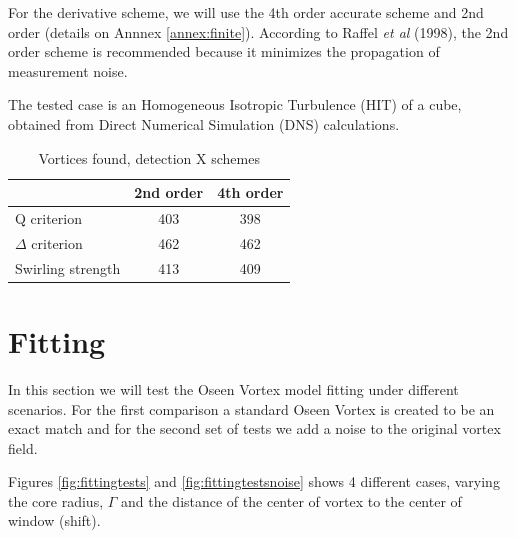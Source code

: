 \documentclass[12pt, a4paper, openany]{memoir}
\begin{document}
For the derivative scheme, we will use the 4th order accurate scheme and 2nd order (details on Annnex \ref{annex:finite}). According to Raffel \textit{et al} (1998), the 2nd order scheme is recommended because it minimizes the propagation of measurement noise.   

The tested case is an Homogeneous Isotropic Turbulence (HIT) of a cube, obtained from Direct Numerical Simulation (DNS) calculations.

\begin{table}[h]
	\centering
	\caption{Vortices found, detection X schemes}
	\vspace{10px}
	\label{tb:detection}
	\begin{tabular}{l|c|c}
		         & 2nd order      & 4th order  \\
		\hline
		Q criterion  & 403  & 398  \\
		$\Delta$ criterion & 462  & 462 \\
		Swirling strength    & 413  & 409
	\end{tabular}
\end{table}

\section{Fitting}

In this section we will test the Oseen Vortex model fitting under different scenarios. For the first comparison a standard Oseen Vortex is created to be an exact match and for the second set of tests we add a noise to the original vortex field.

Figures \ref{fig:fittingtests} and \ref{fig:fittingtestsnoise} shows 4 different cases, varying the core radius, $\Gamma$ and the distance of the center of vortex to the center of window (shift).
\end{document}
